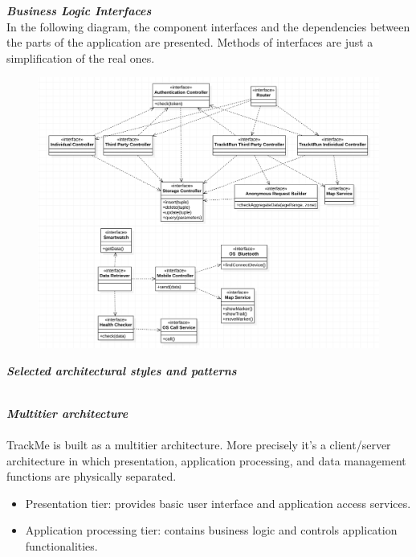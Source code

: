 \begin{legal}
\begin{legal}
\begin{itemize}
						\end{itemize}
					\newpage
					\item \textit{\textbf{Business Logic Interfaces}}\\
						In the following diagram, the component interfaces and the dependencies between the parts of the application are presented. Methods of interfaces are just a simplification of the real ones.\\
						\begin{figure}[H]
							\centering
			  				\includegraphics[width=\linewidth]{../images/design/interfaces.png}
						\end{figure} 
				\end{legal}
		\newpage
		\item \textit{\textbf{Selected architectural styles and patterns}}\\\\
			\begin{legal}
				\item \textit{\textbf{Multitier architecture}}\\\\
				TrackMe is built as a multitier architecture. More precisely it's a client/server architecture in which presentation, application processing, and data management functions are physically separated. 
				\begin{itemize}
					\item Presentation tier: provides basic user interface and application access services.
					\item Application processing tier: contains business logic and controls application functionalities.

\end{itemize}
\end{legal}
\end{legal}
